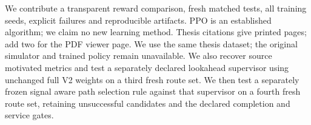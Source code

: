 We contribute a transparent reward comparison, fresh matched tests, all training
seeds, explicit failures and reproducible artifacts. PPO\cite{ppo} is an
established algorithm; we claim no new learning method. Thesis citations give
printed pages; add two for the PDF viewer page. We use the same thesis dataset;
the original simulator and trained policy remain unavailable.
We also recover source motivated metrics and test a separately declared
lookahead supervisor using unchanged full V2 weights on a third fresh route set.
We then test a separately frozen signal aware path selection rule against that
supervisor on a fourth fresh route set, retaining unsuccessful candidates and
the declared completion and service gates.

